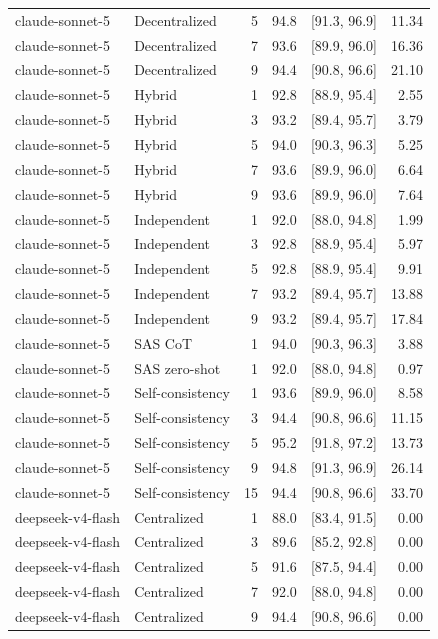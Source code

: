 \begin{tabular}{@{}llrrrr@{}}
claude-sonnet-5 & Decentralized & 5 & 94.8 & [91.3, 96.9] & 11.34 \\
claude-sonnet-5 & Decentralized & 7 & 93.6 & [89.9, 96.0] & 16.36 \\
claude-sonnet-5 & Decentralized & 9 & 94.4 & [90.8, 96.6] & 21.10 \\
claude-sonnet-5 & Hybrid & 1 & 92.8 & [88.9, 95.4] & 2.55 \\
claude-sonnet-5 & Hybrid & 3 & 93.2 & [89.4, 95.7] & 3.79 \\
claude-sonnet-5 & Hybrid & 5 & 94.0 & [90.3, 96.3] & 5.25 \\
claude-sonnet-5 & Hybrid & 7 & 93.6 & [89.9, 96.0] & 6.64 \\
claude-sonnet-5 & Hybrid & 9 & 93.6 & [89.9, 96.0] & 7.64 \\
claude-sonnet-5 & Independent & 1 & 92.0 & [88.0, 94.8] & 1.99 \\
claude-sonnet-5 & Independent & 3 & 92.8 & [88.9, 95.4] & 5.97 \\
claude-sonnet-5 & Independent & 5 & 92.8 & [88.9, 95.4] & 9.91 \\
claude-sonnet-5 & Independent & 7 & 93.2 & [89.4, 95.7] & 13.88 \\
claude-sonnet-5 & Independent & 9 & 93.2 & [89.4, 95.7] & 17.84 \\
claude-sonnet-5 & SAS CoT & 1 & 94.0 & [90.3, 96.3] & 3.88 \\
claude-sonnet-5 & SAS zero-shot & 1 & 92.0 & [88.0, 94.8] & 0.97 \\
claude-sonnet-5 & Self-consistency & 1 & 93.6 & [89.9, 96.0] & 8.58 \\
claude-sonnet-5 & Self-consistency & 3 & 94.4 & [90.8, 96.6] & 11.15 \\
claude-sonnet-5 & Self-consistency & 5 & 95.2 & [91.8, 97.2] & 13.73 \\
claude-sonnet-5 & Self-consistency & 9 & 94.8 & [91.3, 96.9] & 26.14 \\
claude-sonnet-5 & Self-consistency & 15 & 94.4 & [90.8, 96.6] & 33.70 \\
deepseek-v4-flash & Centralized & 1 & 88.0 & [83.4, 91.5] & 0.00 \\
deepseek-v4-flash & Centralized & 3 & 89.6 & [85.2, 92.8] & 0.00 \\
deepseek-v4-flash & Centralized & 5 & 91.6 & [87.5, 94.4] & 0.00 \\
deepseek-v4-flash & Centralized & 7 & 92.0 & [88.0, 94.8] & 0.00 \\
deepseek-v4-flash & Centralized & 9 & 94.4 & [90.8, 96.6] & 0.00 \\

\end{tabular}
